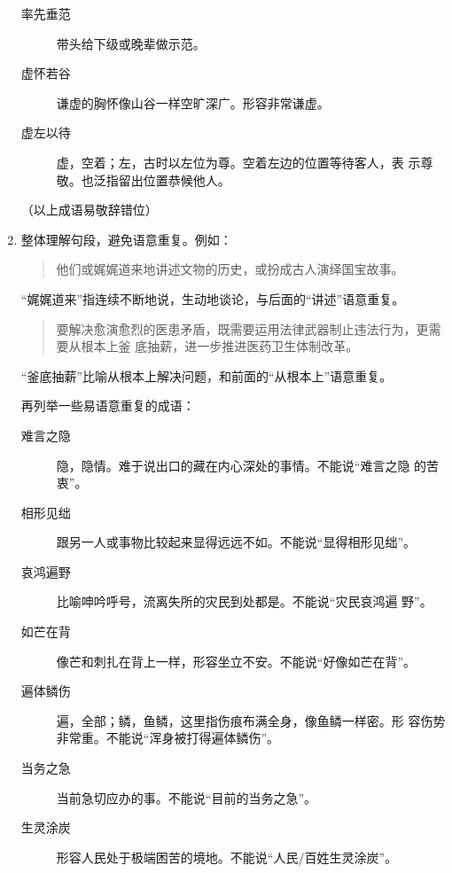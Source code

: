 \documentclass[final,oneside]{ctexbook}
\newenvironment{equotation}{\begin{quotation}\kaishu}{\end{quotation}}
\begin{document}
\begin{enumerate}
\begin{description}
      \item[率先垂范] 带头给下级或晚辈做示范。

      \item[虚怀若谷] 谦虚的胸怀像山谷一样空旷深广。形容非常谦虚。

      \item[虚左以待] 虚，空着；左，古时以左位为尊。空着左边的位置等待客人，表
        示尊敬。也泛指留出位置恭候他人。

    \end{description}

    （以上成语易敬辞错位）

  \item 整体理解句段，避免语意重复。例如：
    \begin{equotation}
      他们或娓娓道来地讲述文物的历史，或扮成古人演绎国宝故事。
    \end{equotation}
    “娓娓道来”指连续不断地说，生动地谈论，与后面的“讲述”语意重复。
    \begin{equotation}
      要解决愈演愈烈的医患矛盾，既需要运用法律武器制止违法行为，更需要从根本上釜
      底抽薪，进一步推进医药卫生体制改革。
    \end{equotation}
    “釜底抽薪”比喻从根本上解决问题，和前面的“从根本上”语意重复。

    再列举一些易语意重复的成语：

    \begin{description}

      \item[难言之隐] 隐，隐情。难于说出口的藏在内心深处的事情。不能说“难言之隐
        的苦衷”。

      \item[相形见绌] 跟另一人或事物比较起来显得远远不如。不能说“显得相形见绌”。

      \item[哀鸿遍野] 比喻呻吟呼号，流离失所的灾民到处都是。不能说“灾民哀鸿遍
        野”。

      \item[如芒在背] 像芒和刺扎在背上一样，形容坐立不安。不能说“好像如芒在背”。

      \item[遍体鳞伤] 遍，全部；鳞，鱼鳞，这里指伤痕布满全身，像鱼鳞一样密。形
        容伤势非常重。不能说“浑身被打得遍体鳞伤”。

      \item[当务之急] 当前急切应办的事。不能说“目前的当务之急”。

      \item[生灵涂炭] 形容人民处于极端困苦的境地。不能说“人民/百姓生灵涂炭”。


\end{description}
\end{enumerate}
\end{document}
